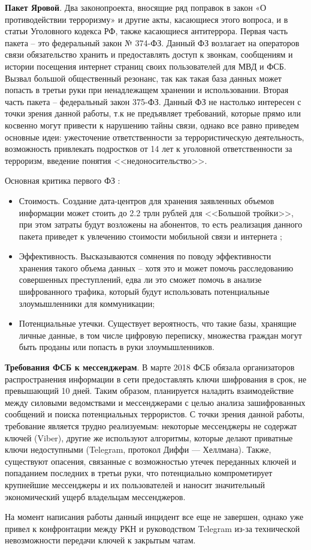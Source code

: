 	\textbf{Пакет Яровой}. Два законопроекта, вносящие ряд поправок в закон «О противодействии терроризму» и другие акты, касающиеся этого вопроса, и в статьи Уголовного кодекса РФ, также касающиеся антитеррора. Первая часть пакета -- это федеральный 	закон № 374-ФЗ. Данный ФЗ возлагает на операторов связи обязательство хранить и предоставлять доступ к звонкам, сообщениям и истории посещения интернет страниц своих пользователей для МВД и ФСБ. Вызвал большой общественный резонанс, так как такая база данных может попасть в третьи руки при ненадлежащем хранении и использовании. Вторая часть пакета -- федеральный закон 375-ФЗ. Данный ФЗ не настолько интересен с точки зрения данной работы, т.к не предъявляет требований, которые прямо или косвенно могут привести к нарушению тайны связи, однако все равно приведем основные идеи: ужесточение ответственности за террористическую деятельность, возможность привлекать подростков от 14 лет к уголовной ответственности за терроризм, введение понятия <<недоносительство>>.  
	
	Основная критика первого ФЗ :
	\begin{itemize}
		\item Стоимость. Создание дата-центров для хранения заявленных объемов информации может стоить до 2.2 трлн рублей для <<Большой тройки>>, при этом затраты будут возложены на абонентов, то есть реализация данного пакета приведет  к увлечению стоимости мобильной  связи и интернета ; %
		\item Эффективность. Высказываются сомнения по поводу эффективности хранения такого объема данных -- хотя это и может помочь расследованию совершенных преступлений, едва ли это сможет помочь в анализе шифрованного трафика, который будут использовать потенциальные злоумышленники для коммуникации;
		\item Потенциальные утечки. Существует  вероятность, что такие базы, хранящие личные данные, в том числе цифровую переписку, множества граждан могут быть проданы или попасть в руки злоумышленников.    
	\end{itemize}
	
	
	\textbf{Требования ФСБ к мессенджерам}. В марте 2018 ФСБ обязала организаторов распространения информации в сети предоставлять ключи шифрования в срок, не превышающий 10 дней. %
	Таким образом, планируется наладить взаимодействие между силовыми ведомствами и мессенджерами  с целью анализа зашифрованных сообщений и поиска потенциальных террористов. С точки зрения данной работы, требование является трудно реализуемым: некоторые мессенджеры  не содержат ключей (Viber), другие же используют алгоритмы, которые делают приватные ключи недоступными (Telegram, протокол Диффи — Хеллмана). %
	Также, существуют опасения, связанные с возможностью утечек переданных ключей  и попаданием последних в третьи руки, что потенциально компрометирует крупнейшие мессенджеры и их пользователей и наносит значительный экономический ущерб владельцам мессенджеров.
	
	На момент написания работы данный инцидент все еще не завершен, однако уже привел к конфронтации между РКН и руководством Telegram из-за технической невозможности передачи ключей к закрытым чатам. 
\newpage